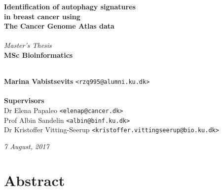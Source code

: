 \documentclass[10pt, openright,oneside]{book}
\begin{document}
\frontmatter
    \thispagestyle{empty}
    
    \vspace*{4.5cm} 
    \noindent \textbf{\huge Identification of autophagy signatures\\ in breast cancer using\\ The Cancer Genome Atlas data} \\
    \\[0.5cm]
    \textit{\Large Master's Thesis} \\
    [0.5cm]
    \textbf{\Large MSc Bioinformatics} \\
    \vspace*{.1cm} \\
    \begin{tabbing}
    \textbf{Marina Vabistsevits} \hspace{1cm} \= \texttt{<rzq995@alumni.ku.dk>} \\
    \\[9cm]
    \textbf{\Large Supervisors} \\
    Dr Elena Papaleo \> \texttt{<elenap@cancer.dk>} \\
    Prof Albin Sandelin \> \texttt{<albin@binf.ku.dk>} \\
    Dr Kristoffer Vitting-Seerup\> \texttt{<kristoffer.vittingseerup@bio.ku.dk>}
    \\[1cm]
    
    \end{tabbing}
    \begin{center}
    \textit{7 August, 2017} 
    \end{center}

    \newpage
    \ClearWallPaper
    



\pagestyle{plain}


\frontmatter

\chapter{Abstract}

\end{document}
